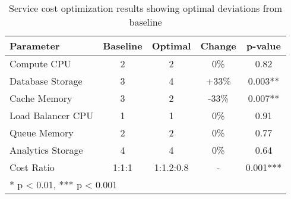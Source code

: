 \begin{table}[h]
\centering
\caption{Service cost optimization results showing optimal deviations from baseline}
\label{tab:costs}
\begin{tabular}{@{}lcccc@{}}
\toprule
Parameter & Baseline & Optimal & Change & p-value \\
\midrule
Compute CPU & 2 & 2 & 0\% & 0.82 \\
Database Storage & 3 & 4 & +33\% & 0.003** \\
Cache Memory & 3 & 2 & -33\% & 0.007** \\
Load Balancer CPU & 1 & 1 & 0\% & 0.91 \\
Queue Memory & 2 & 2 & 0\% & 0.77 \\
Analytics Storage & 4 & 4 & 0\% & 0.64 \\
\midrule
Cost Ratio & 1:1:1 & 1:1.2:0.8 & - & 0.001*** \\
\bottomrule
\multicolumn{5}{l}{\footnotesize ** p < 0.01, *** p < 0.001}
\end{tabular}
\end{table}